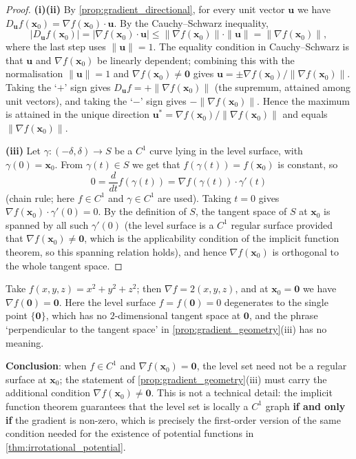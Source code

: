 \begin{proof}
\textbf{(i)(ii)} By \cref{prop:gradient_directional}, for every unit vector $\mathbf u$ we have $D_{\mathbf u}f(\mathbf x_0) = \nabla f(\mathbf x_0)\cdot\mathbf u$. By the Cauchy--Schwarz inequality,
\[
|D_{\mathbf u}f(\mathbf x_0)| = |\nabla f(\mathbf x_0)\cdot\mathbf u| \le \|\nabla f(\mathbf x_0)\|\cdot\|\mathbf u\| = \|\nabla f(\mathbf x_0)\|,
\]
where the last step uses $\|\mathbf u\|=1$. The equality condition in Cauchy--Schwarz is that $\mathbf u$ and $\nabla f(\mathbf x_0)$ be linearly dependent; combining this with the normalisation $\|\mathbf u\|=1$ and $\nabla f(\mathbf x_0)\ne\mathbf 0$ gives $\mathbf u = \pm\nabla f(\mathbf x_0)/\|\nabla f(\mathbf x_0)\|$. Taking the `$+$' sign gives $D_{\mathbf u}f = +\|\nabla f(\mathbf x_0)\|$ (the supremum, attained among unit vectors), and taking the `$-$' sign gives $-\|\nabla f(\mathbf x_0)\|$. Hence the maximum is attained in the unique direction $\mathbf u^\ast = \nabla f(\mathbf x_0)/\|\nabla f(\mathbf x_0)\|$ and equals $\|\nabla f(\mathbf x_0)\|$.

\textbf{(iii)} Let $\gamma:(-\delta,\delta)\to S$ be a $C^1$ curve lying in the level surface, with $\gamma(0)=\mathbf x_0$. From $\gamma(t)\in S$ we get that $f(\gamma(t)) = f(\mathbf x_0)$ is constant, so
\[
0 = \frac{d}{dt}f(\gamma(t)) = \nabla f(\gamma(t))\cdot\gamma'(t)
\]
(chain rule; here $f\in C^1$ and $\gamma\in C^1$ are used). Taking $t=0$ gives $\nabla f(\mathbf x_0)\cdot\gamma'(0)=0$. By the definition of $S$, the tangent space of $S$ at $\mathbf x_0$ is spanned by all such $\gamma'(0)$ (the level surface is a $C^1$ regular surface provided that $\nabla f(\mathbf x_0)\ne\mathbf 0$, which is the applicability condition of the implicit function theorem, so this spanning relation holds), and hence $\nabla f(\mathbf x_0)$ is orthogonal to the whole tangent space.
\end{proof}

\begin{example}\label{ex:gradient_critical_point}
Take $f(x,y,z) = x^2+y^2+z^2$; then $\nabla f = 2(x,y,z)$, and at $\mathbf x_0=\mathbf 0$ we have $\nabla f(\mathbf 0)=\mathbf 0$. Here the level surface $f = f(\mathbf 0) = 0$ degenerates to the single point $\{\mathbf 0\}$, which has no $2$-dimensional tangent space at $\mathbf 0$, and the phrase `perpendicular to the tangent space' in \cref{prop:gradient_geometry}(iii) has no meaning.

\textbf{Conclusion}: when $f\in C^1$ and $\nabla f(\mathbf x_0)=\mathbf 0$, the level set need not be a regular surface at $\mathbf x_0$; the statement of \cref{prop:gradient_geometry}(iii) must carry the additional condition $\nabla f(\mathbf x_0)\ne\mathbf 0$. This is not a technical detail: the implicit function theorem guarantees that the level set is locally a $C^1$ graph \textbf{if and only if} the gradient is non-zero, which is precisely the first-order version of the same condition needed for the existence of potential functions in \cref{thm:irrotational_potential}.
\end{example}


